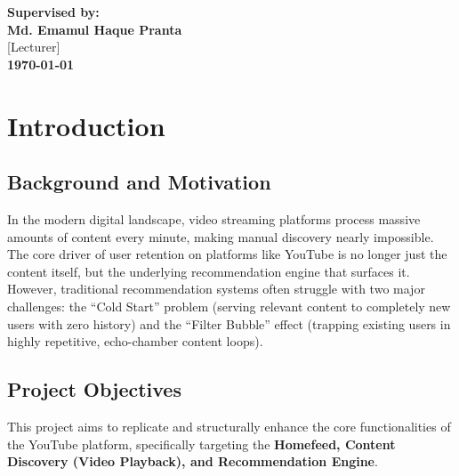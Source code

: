 \documentclass[11pt, a4paper]{report}
\begin{document}
\begin{titlepage}
    \vfill
    
    {\large \textbf{Supervised by:}}\\[0.3cm]
    {\Large \textbf{Md. Emamul Haque Pranta}}\\[0.1cm]
    {\normalsize [Lecturer]}\\[1cm]
    
    {\large \textbf{\today}}\\[0.5cm]
\end{titlepage}

\tableofcontents
\newpage

\chapter{Introduction}

\section{Background and Motivation}
In the modern digital landscape, video streaming platforms process massive amounts of content every minute, making manual discovery nearly impossible. The core driver of user retention on platforms like YouTube is no longer just the content itself, but the underlying recommendation engine that surfaces it. However, traditional recommendation systems often struggle with two major challenges: the ``Cold Start'' problem (serving relevant content to completely new users with zero history) and the ``Filter Bubble'' effect (trapping existing users in highly repetitive, echo-chamber content loops). 

\section{Project Objectives}
This project aims to replicate and structurally enhance the core functionalities of the YouTube platform, specifically targeting the \textbf{Homefeed, Content Discovery (Video Playback), and Recommendation Engine}. 
\end{document}
